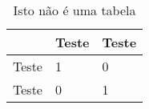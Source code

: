 \begin{table}[H]
\centering
\caption{Isto não é uma tabela}\label{tabela}
\begin{tabular}{lll}
\hline
\textbf{} & \textbf{Teste} & \textbf{Teste} \\ \hline
Teste     & 1              & 0              \\
Teste     & 0              & 1              \\ \hline
\end{tabular}
\end{table}